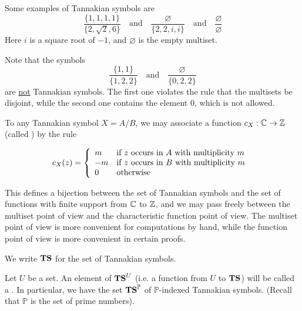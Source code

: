 \begin{example}
Some examples of Tannakian symbols are 
$$    \frac{   \{  1,1, 1, 1  \}   }{  \{  2, \sqrt{2}, 6  \}   } \quad \textrm{and} \quad   \frac{   \varnothing   }{  \{  2, 2, i, i  \}   }   \quad \textrm{and} \quad  \frac{  \varnothing  }{     \varnothing }    $$
Here $i$ is a square root of $-1$, and $\varnothing$ is the empty multiset.
\end{example}

\begin{example}
Note that the symbols 
$$    \frac{   \{  1, 1  \}   }{  \{  1, 2, 2  \}   } \quad \textrm{and} \quad   \frac{   \varnothing   }{  \{  0, 2, 2  \}   }      $$
are \underline{not} Tannakian symbols. The first one violates the rule that the multisets be disjoint, while the second one contains the element $0$, which is not allowed.
\end{example}

\begin{definition}
To any Tannakian symbol $X = A/B$, we may associate a function $c_X : \mathbb{C} \to \mathbb{Z}$ (called )  by the rule

$$  c_X(z) = \left\{ \begin{array}{lll}  m  & \mbox{if } z \textrm{ occurs in $A$ with multiplicity $m$}  \\   -m  & \mbox{if }  z \textrm{ occurs in $B$ with multiplicity $m$  }  \\ 0 & \mbox{} \textrm{otherwise} \end{array} \right.   $$
\end{definition}
\begin{remark}

This defines a bijection between the set of Tannakian symbols and the set of functions with finite support from $\mathbb{C}$ to $\mathbb{Z}$, and we may pass freely between the multiset point of view and the characteristic function point of view. The multiset point of view is more convenient for computations by hand, while the function point of view is more convenient in certain proofs. 
\end{remark}

\begin{definition}
We write $\mathbf{TS}$ for the set of Tannakian symbols.
\end{definition}

\begin{definition}
Let $U$ be a set. An element of $\mathbf{TS}^U$ (i.e. a function from $U$ to $\mathbf{TS}$) will be called a . In particular, we have the set $\mathbf{TS}^{\mathbb{P}}$ of $\mathbb{P}$-indexed Tannakian symbols. (Recall that $\mathbb{P}$ is the set of prime numbers).
\end{definition}

